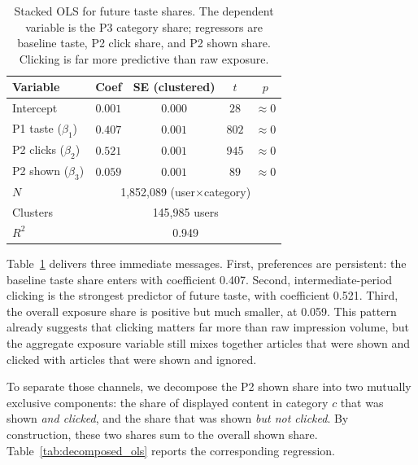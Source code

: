 \documentclass[11pt]{article}
\begin{document}
\begin{table}[ht]
\centering
\caption{Stacked OLS for future taste shares. The dependent variable is the P3 category share; regressors are baseline taste, P2 click share, and P2 shown share. Clicking is far more predictive than raw exposure.}
\label{tab:stacked_ols}
\begin{tabular}{lcccc}
\toprule
Variable & Coef & SE (clustered) & $t$ & $p$ \\
\midrule
Intercept & $0.001$ & $0.000$ & $28$ & $\approx 0$ \\
P1 taste ($\beta_1$) & $0.407$ & $0.001$ & $802$ & $\approx 0$ \\
P2 clicks ($\beta_2$) & $0.521$ & $0.001$ & $945$ & $\approx 0$ \\
P2 shown ($\beta_3$) & $0.059$ & $0.001$ & $89$ & $\approx 0$ \\
\midrule
$N$ & \multicolumn{4}{c}{1,852,089 (user$\times$category)} \\
Clusters & \multicolumn{4}{c}{145,985 users} \\
$R^2$ & \multicolumn{4}{c}{0.949} \\
\bottomrule
\end{tabular}
\end{table}
\FloatBarrier

Table~\ref{tab:stacked_ols} delivers three immediate messages. First, preferences are persistent: the baseline taste share enters with coefficient 0.407. Second, intermediate-period clicking is the strongest predictor of future taste, with coefficient 0.521. Third, the overall exposure share is positive but much smaller, at 0.059. This pattern already suggests that clicking matters far more than raw impression volume, but the aggregate exposure variable still mixes together articles that were shown and clicked with articles that were shown and ignored.

To separate those channels, we decompose the P2 shown share into two mutually exclusive components: the share of displayed content in category $c$ that was shown \emph{and clicked}, and the share that was shown \emph{but not clicked}. By construction, these two shares sum to the overall shown share. Table~\ref{tab:decomposed_ols} reports the corresponding regression.
\end{document}
